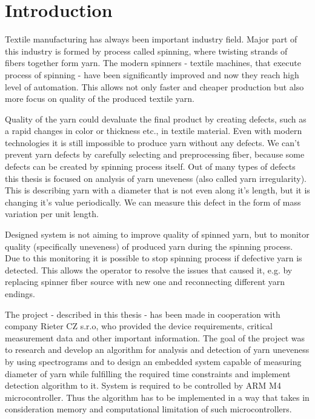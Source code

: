 \documentclass[twoside]{ctuthesis}
\theoremstyle{plain}
\theoremstyle{definition}
\theoremstyle{note}
\begin{document}
\maketitle

\chapter{Introduction}
Textile manufacturing has always been important industry field. Major part of this industry is formed by process called spinning, where twisting strands of fibers together form yarn. The modern spinners - textile machines, that execute process of spinning - have been significantly improved and now they reach high level of automation. This allows not only faster and cheaper production but also more focus on quality of the produced textile yarn. 

Quality of the yarn could devaluate the final product by creating defects, such as a rapid changes in color or thickness etc., in textile material. Even with modern technologies it is still impossible to produce yarn without any defects. We can't prevent yarn defects by carefully selecting and preprocessing fiber, because some defects can be created by spinning process itself. Out of many types of defects this thesis is focused on analysis of yarn uneveness (also called yarn irregularity). This is describing yarn with a diameter that is not even along it's length, but it is changing it's value periodically. We can measure this defect in the form of mass variation per unit length.

Designed system is not aiming to improve quality of spinned yarn, but to monitor quality (specifically uneveness) of produced yarn during the spinning process. Due to this monitoring it is possible to stop spinning process if defective yarn is detected. This allows the operator to resolve the issues that caused it, e.g. by replacing spinner fiber source with new one and reconnecting different yarn endings.

The project - described in this thesis - has been made in cooperation with company Rieter CZ s.r.o, who provided the device requirements, critical measurement data and other important information. The goal of the project was to research and develop an algorithm for analysis and detection of yarn uneveness by using spectrograms and to design an embedded system capable of measuring diameter of yarn while fulfilling the required time constraints and implement detection algorithm to it. System is required to be controlled by ARM M4 microcontroller. Thus the algorithm has to be implemented in a way that takes in consideration memory and computational limitation of such microcontrollers.
\end{document}
